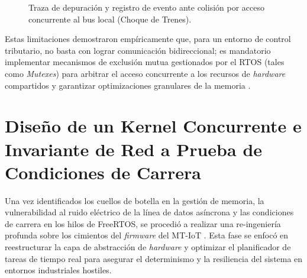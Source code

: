 \begin{figure}[htbp]
\centering
{}
\caption{Traza de depuración y registro de evento ante colisión por acceso concurrente al bus local (Choque de Trenes).}
\label{fig:choque_trenes}
\end{figure}

\par Estas limitaciones demostraron empíricamente que, para un entorno de control tributario, 
no basta con lograr comunicación bidireccional; es mandatorio implementar mecanismos de 
exclusión mutua gestionados por el RTOS (tales como \textit{Mutexes}) para arbitrar el acceso 
concurrente a los recursos de \textit{hardware} compartidos y garantizar optimizaciones granulares de la memoria \cite{Espressif_ESP32_Datasheet}.

\section{Diseño de un Kernel Concurrente e Invariante de Red a Prueba de Condiciones de Carrera}

\par Una vez identificados los cuellos de botella en la gestión de memoria, la vulnerabilidad al ruido eléctrico de la línea de datos asíncrona y las condiciones de carrera en los hilos de FreeRTOS, se procedió a realizar una re-ingeniería profunda sobre los cimientos del \textit{firmware} del MT-IoT \cite{Espressif_ESP_IDF_v552}. Esta fase se enfocó en reestructurar la capa de abstracción de \textit{hardware} y optimizar el planificador de tareas de tiempo real para asegurar el determinismo y la resiliencia del sistema en entornos industriales hostiles.

